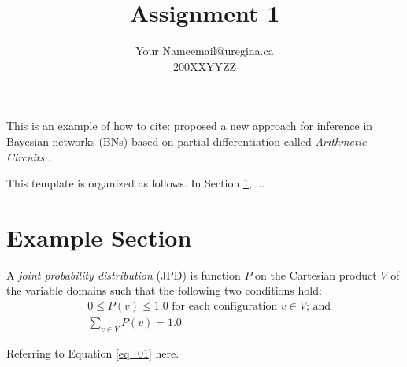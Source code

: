 \documentclass[twoside,11pt]{article}
\makeatletter
\newcommand\assignmentNumber{1}                             %
\newcommand\studentName{Your Name}                  %
\newcommand\studentEmail{email@uregina.ca}          %
\newcommand\studentNumber{200XXYYZZ}                %
\makeatother
\begin{document}
    
    \title{Assignment \assignmentNumber}
    
    \author{\name \studentName \email \studentEmail \\
    \studentNumber
    \addr
    }
    
    \maketitle

This is an example of how to cite:
\cite{darwiche00} proposed a new approach for inference in Bayesian networks (BNs) \citep{pear88}  based on partial differentiation called \emph{Arithmetic Circuits} \citep{darwiche00}.

This template is organized as follows.
In Section \ref{sec:background}, $\ldots$


\section{Example Section}
\label{sec:background}


A \emph{joint probability distribution} (JPD) is function $P$ on the Cartesian product $V$ of the variable domains such that the following two conditions hold: 
\begin{align}
	&0 \leq P(v) \leq 1.0\text{ for each configuration $v \in V$; and}\\ \label{eq_01}		
	&\sum_{v \in V}{P(v)} = 1.0
\end{align}

Referring to Equation \ref{eq_01} here.

\end{document}
